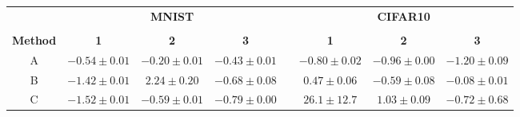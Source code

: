 \documentclass{standalone}
\begin{document}
\begin{tabular}{cccccccc}
    \toprule
                    & \multicolumn{3}{c}{\textbf{MNIST}} &                           & \multicolumn{3}{c}{\textbf{CIFAR10}}                                            \\
    \cline{2-4} \cline{6-8}                                                                                                                                            \\
    \textbf{Method} & \textbf{1}                         & \textbf{2}                & \textbf{3}                           &   & \textbf{1} & \textbf{2} & \textbf{3} \\
    \midrule
    A
                    & $-0.54 \pm 0.01$                   & $-0.20 \pm 0.01$          & $-0.43 \pm 0.01$                     &
                    & $-0.80 \pm 0.02$                   & $-0.96 \pm 0.00$          & $-1.20 \pm 0.09$                                                                \\

    B
                    & $-1.42 \pm 0.01$                   & $2.24 \pm 0.20$           & $-0.68 \pm 0.08$                     &
                    & $0.47 \pm 0.06$                    & $-0.59 \pm 0.08$          & $-0.08 \pm 0.01$                                                                \\

    C
                    & $\mathbf{-1.52 \pm 0.01}$          & $\mathbf{-0.59 \pm 0.01}$ & $\mathbf{-0.79 \pm 0.00}$            &
                    & $ 26.1 \pm 12.7$                   & $ 1.03 \pm 0.09$          & $ -0.72 \pm 0.68$                                                               \\
    \bottomrule
\end{tabular}
\end{document}

